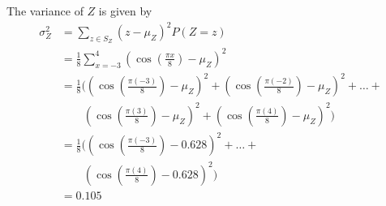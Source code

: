 \documentclass[answers]{exam}
\begin{document}
\begin{questions}
\begin{parts}
\begin{solution}
            The variance of $Z$ is given by
            \begin{align*}
                \sigma_Z^2 & = \sum_{z \in S_Z} (z - \mu_Z)^2 P(Z = z)                                                                                                                                                                      \\
                           & = \frac{1}{8} \sum_{x = -3}^4 (\cos \left(\frac{\pi x}{8}\right) - \mu_Z)^2                                                                                                                                    \\
                           & = \frac{1}{8} ((\cos \left(\frac{\pi (-3)}{8}\right) - \mu_Z)^2 + (\cos \left(\frac{\pi (-2)}{8}\right) - \mu_Z)^2 + \dots +                                                                                   \\
                           & \qquad (\cos \left(\frac{\pi (3)}{8}\right) - \mu_Z)^2 + (\cos \left(\frac{\pi (4)}{8}\right) - \mu_Z)^2)                                                                                                      \\
                           & = \frac{1}{8} ((\cos \left(\frac{\pi (-3)}{8}\right) - 0.628)^2 + \dots +\\
                           & \qquad (\cos \left(\frac{\pi (4)}{8}\right) - 0.628)^2) \\
                           & = 0.105
            \end{align*}

        \end{solution}

\end{parts}
\end{questions}
\end{document}
